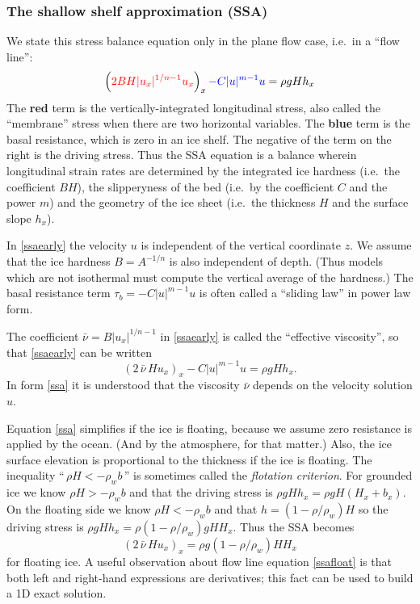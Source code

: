 \documentclass[letterpaper,final,12pt,reqno]{amsart}
\begin{document}
\subsubsection*{The shallow shelf approximation (SSA)}  We state this stress balance equation only in the plane flow case, i.e.~in a ``flow line'':
\begin{equation}
  \left({\color{red} 2 B H |u_x|^{1/n - 1} u_x}\right)_x {\color{blue} - C|u|^{m-1}u} = \rho g H h_x \label{ssaearly}
\end{equation}
The {\color{red} \textbf{red}} term is the vertically-integrated longitudinal stress, also called the ``membrane'' stress when there are two horizontal variables.  The {\color{blue} \textbf{blue}} term is the basal resistance, which is zero in an ice shelf.  The negative of the term on the right is the driving stress.  Thus the SSA equation is a balance wherein longitudinal strain rates are determined by the integrated ice hardness (i.e.~the coefficient $BH$), the slipperyness of the bed (i.e.~by the coefficient $C$ and the power $m$) and the geometry of the ice sheet (i.e.~the thickness $H$ and the surface slope $h_x$).

In \eqref{ssaearly} the velocity $u$ is independent of the vertical coordinate $z$.  We assume that the ice hardness $B=A^{-1/n}$ is also independent of depth.  (Thus models which are not isothermal must compute the vertical average of the hardness.)  The basal resistance term $\tau_b = - C|u|^{m-1}u$ is often called a ``sliding law'' in power law form.

The coefficient $\bar \nu = B |u_x|^{1/n-1}$ in \eqref{ssaearly} is called the ``effective viscosity'', so that \eqref{ssaearly} can be written
\begin{equation}
  \left(2 \,\bar \nu\, H u_x\right)_x - C |u|^{m-1} u = \rho g H h_x.  \label{ssa}
\end{equation}
In form \eqref{ssa} it is understood that the viscosity $\bar\nu$ depends on the velocity solution $u$.

Equation \eqref{ssa} simplifies if the ice is floating, because we assume zero resistance is applied by the ocean.  (And by the atmosphere, for that matter.)  Also, the ice surface elevation is proportional to the thickness if the ice is floating.  The inequality ``$\,\rho H < - \rho_w b\,$'' is sometimes called the \emph{flotation criterion}.  For grounded ice we know $\rho H > - \rho_w b$ and that the driving stress is $\rho g H h_x = \rho g H (H_x + b_x)$.  On the floating side we know $\rho H < - \rho_w b$ and that $h = (1-\rho/\rho_w) H$ so the driving stress is $\rho g H h_x = \rho(1-\rho/\rho_w) g H H_x$.  Thus the SSA becomes
\begin{equation}
   \left(2 \,\bar\nu\, H u_x\right)_x = \rho g (1-\rho/\rho_w) H H_x \label{ssafloat}
\end{equation}
for floating ice.  A useful observation about flow line equation \eqref{ssafloat} is that both left and right-hand expressions are derivatives; this fact can be used to build a 1D exact solution.
\end{document}
